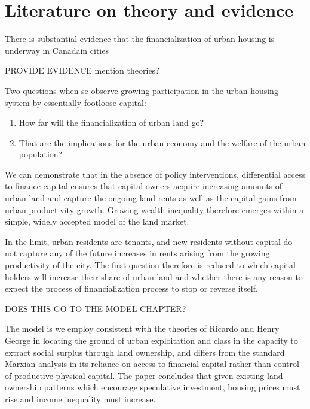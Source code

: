 \section{Literature on theory and evidence}
There is substantial evidence that the financialization of urban housing is underway in Canadain cities

PROVIDE EVIDENCE 	mention theories?


Two questions when se observe growing participation in the urban housing system by essentially footloose capital: \begin{enumerate}
\item How far will the financialization of urban land go? 
\item That are the implications for the urban economy and the welfare of the urban population? 
\end{enumerate}

We can demonstrate  that  in the absence of policy interventions, differential access to finance capital ensures that capital owners acquire increasing amounts of urban land and capture the ongoing land rents as well as the capital gains from urban productivity growth. Growing wealth inequality therefore emerges within a simple, widely accepted model of the land market.

In the limit,  urban residents are tenants, and new residents  without capital do  not capture any of the future  increases in rents arising from the growing productivity of the city. The first question therefore is reduced to which capital holders will increase their share of urban land and whether there is any reason to expect the process of financialization process to stop or reverse itself.



DOES THIS GO TO THE MODEL CHAPTER?

The model is we employ consistent with the theories of Ricardo and Henry George in locating the ground of urban exploitation and class in the capacity to extract social surplus through land ownership, and differs from the standard Marxian analysis in its reliance on access to financial capital rather than control of productive physical capital. The paper concludes that given existing land ownership patterns which encourage speculative investment, housing prices must rise and income inequality must increase. 



